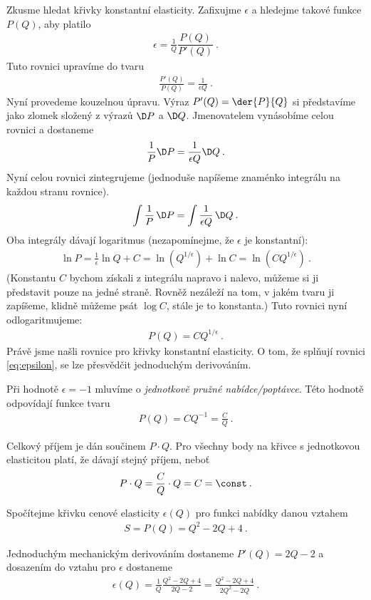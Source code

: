 Zkusme hledat křivky konstantní elasticity. Zafixujme $\epsilon$ a hledejme takové funkce $P(Q)$, aby platilo \begin{align}
    \epsilon = \frac{1}{Q} \dfrac{P(Q)}{P'(Q)} \:.
\end{align}
Tuto rovnici upravíme do tvaru \begin{align}
    \frac{P'(Q)}{P(Q)} = \frac{1}{\epsilon Q} \:.
\end{align}
Nyní provedeme kouzelnou úpravu. Výraz $P'(Q) = \der{P}{Q}$ si představíme jako zlomek složený z výrazů $\D P$ a $\D Q$. Jmenovatelem vynásobíme celou rovnici a dostaneme
\begin{align}
    \frac{1}{P} \D P = \frac{1}{\epsilon Q} \D Q \:.
\end{align}
Nyní celou rovnici zintegrujeme (jednoduše napíšeme znaménko integrálu na každou stranu rovnice).
\begin{align}
    \int \frac{1}{P} \, \D P = \int \frac{1}{\epsilon Q} \, \D Q \:.
\end{align}
Oba integrály dávají logaritmus (nezapomínejme, že $\epsilon$ je konstantní):
\begin{align}
    \ln P = \frac{1}{\epsilon} \ln Q + C = \ln \left( Q^{1/\epsilon} \right) + \ln C = \ln \left( C Q^{1/\epsilon} \right) \:.
\end{align}
(Konstantu $C$ bychom získali z integrálu napravo i nalevo, můžeme si ji představit pouze na jedné straně. Rovněž nezáleží na tom, v jakém tvaru ji zapíšeme, klidně můžeme psát $\log C$, stále je to konstanta.)
Tuto rovnici nyní odlogaritmujeme:
\begin{align}
    \boxed{ P(Q) = C Q^{1/\epsilon} }\:.
\end{align}
Právě jsme našli rovnice pro křivky konstantní elasticity. O tom, že splňují rovnici \eqref{eq:epsilon}, se lze přesvědčit jednoduchým derivováním.

Při hodnotě $\epsilon = -1$ mluvíme o \textit{jednotkově pružné nabídce/poptávce}. Této hodnotě odpovídají funkce tvaru 
\begin{align}
    P(Q) = C Q^{-1} = \frac{C}{Q} \:.
\end{align}


Celkový příjem je dán součinem $P\cdot Q$. Pro všechny body na křivce s jednotkovou elasticitou platí, že dávají stejný příjem, neboť 
\begin{align}
    P \cdot Q = \frac{C}{Q} \cdot Q = C = \const \:.
\end{align}


\begin{example}
    Spočítejme křivku cenové elasticity $\epsilon(Q)$ pro funkci nabídky danou vztahem \begin{align}
        S = P(Q) = Q^2 - 2Q + 4 \:.
    \end{align}

    Jednoduchým mechanickým derivováním dostaneme $P'(Q) = 2Q - 2$ a dosazením do vztahu pro $\epsilon$ dostaneme \begin{align}
        \epsilon(Q) = \frac{1}{Q} \frac{Q^2 - 2Q + 4}{2Q - 2} = \frac{Q^2 - 2Q + 4}{2Q^2 - 2 Q} \:.
    \end{align}
\end{example}

